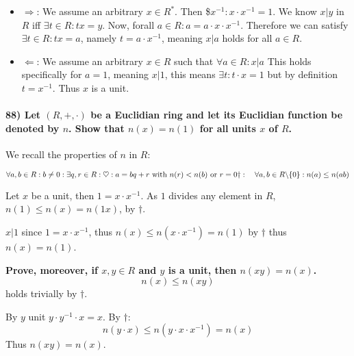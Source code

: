 \documentclass[
]{article}
\providecommand{\tightlist}{%
  \setlength{\itemsep}{0pt}\setlength{\parskip}{0pt}}
\begin{document}
\begin{itemize}
\tightlist
\item
  \(\Rightarrow\): We assume an arbitrary \(x \in R^*\). Then
  \$\exists \(x^{-1}: x \cdot x^{-1} = 1\). We know \(x |y\) in \(R\)
  iff \(\exists t \in R : tx = y\). Now, forall
  \(a \in R: a = a \cdot x \cdot x^{-1}\). Therefore we can satisfy
  \(\exists t \in R : tx = a\), namely \(t = a \cdot x^{-1}\), meaning
  \(x|a\) holds for all \(a \in R\).
\item
  \(\Leftarrow\): We assume an arbitrary \(x \in R\) such that
  \(\forall a \in R: x |a\) This holds specifically for \(a = 1\),
  meaning \(x | 1\), this means \(\exists t: t \cdot x = 1\) but by
  definition \(t = x^{-1}\). Thus \(x\) is a unit.
\end{itemize}

\hypertarget{let-rcdot-be-a-euclidian-ring-and-let-its-euclidian-function-be-denoted-by-n.-show-that-nx-n1-for-all-units-x-of-r.}{%
\paragraph{\texorpdfstring{88) Let \((R,+,\cdot)\) be a Euclidian ring
and let its Euclidian function be denoted by \(n\). Show that
\(n(x) = n(1)\) for all units \(x\) of
\(R\).}{88) Let (R,+,\textbackslash cdot) be a Euclidian ring and let its Euclidian function be denoted by n. Show that n(x) = n(1) for all units x of R.}}\label{let-rcdot-be-a-euclidian-ring-and-let-its-euclidian-function-be-denoted-by-n.-show-that-nx-n1-for-all-units-x-of-r.}}

We recall the properties of \(n\) in \(R\):

\[
\forall a,b \in R: b \neq 0: \exists q,r \in R:\\
\heartsuit: a = bq+r \text{ with } n(r) < n(b) \text{ or } r = 0\\
\dagger: \quad \forall a,b \in R\backslash \{0\}: n(a) \leq n(ab) 
\]

Let \(x\) be a unit, then \(1 = x \cdot x^{-1}\). As \(1\) divides any
element in \(R\), \(n(1) \leq n(x) = n(1x)\), by \(\dagger\).

\(x|1\) since \(1 = x \cdot x^{-1}\), thus
\(n(x) \leq n(x \cdot x ^{-1}) = n(1)\) by \(\dagger\) thus
\(n(x) = n(1)\).

\textbf{Prove, moreover, if \(x,y \in R\) and \(y\) is a unit, then
\(n(xy) = n(x)\).} \[
n(x) \leq n(xy)
\] holds trivially by \(\dagger\).

By \(y\) unit \(y \cdot y^{-1} \cdot x = x\). By \(\dagger\): \[
n(y \cdot x) \leq n(y\cdot x \cdot x^{-1}) = n(x)
\] Thus \(n(xy) = n(x)\).
\end{document}
